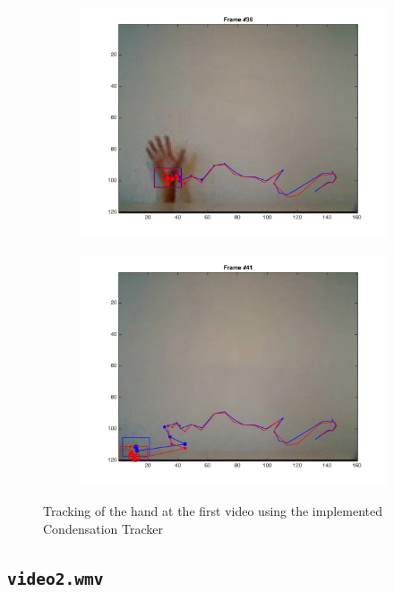 \documentclass{ethz_report}
\begin{document}
\begin{figure}[H]
\begin{subfigure}[b]{.25\textwidth}
    \end{subfigure}%
    \begin{subfigure}[b]{.25\textwidth}
        \centering
        \includegraphics[width=1\linewidth]{images/video1_26}
    \end{subfigure}%
    \begin{subfigure}[b]{.25\textwidth}
        \centering
        \includegraphics[width=1\linewidth]{images/video1_31}
    \end{subfigure}
    \caption{Tracking of the hand at the first video using the implemented Condensation Tracker}
    \label{fig:tracking_video1}
\end{figure}

\subsection*{\texttt{video2.wmv}}
\end{document}
